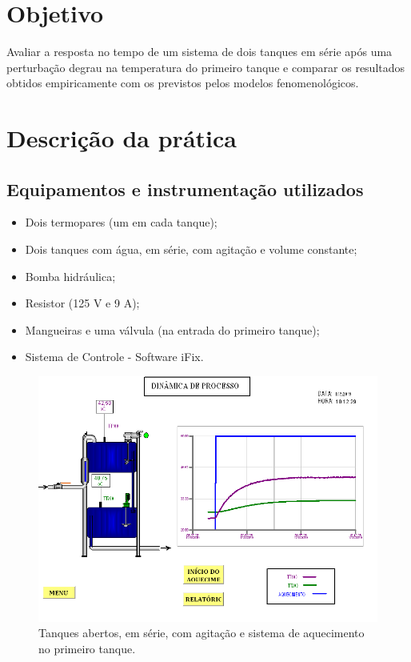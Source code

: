 \chapter{Objetivo}

Avaliar a resposta no tempo de um sistema de dois tanques em série após uma perturbação degrau na temperatura do primeiro tanque e comparar os resultados obtidos empiricamente com os previstos pelos modelos fenomenológicos.


\chapter{Descrição da prática}

\section{Equipamentos e instrumentação utilizados}

\begin{itemize}
\item Dois termopares (um em cada tanque);
\item Dois tanques com água, em série, com agitação e volume constante;
\item Bomba hidráulica;
\item Resistor (125 V e 9 A);
\item Mangueiras e uma válvula (na entrada do primeiro tanque);
\item Sistema de Controle - Software iFix.
\end{itemize}

\begin{figure}[H]
	\begin{center}
		\includegraphics[scale=.8, trim={0 0 0 0}]{figuras/ladeq/dina/ft2}
		\caption{Tanques abertos, em série, com agitação e sistema de aquecimento no primeiro tanque.}
		\label{aparato}
	\end{center}
\end{figure}

